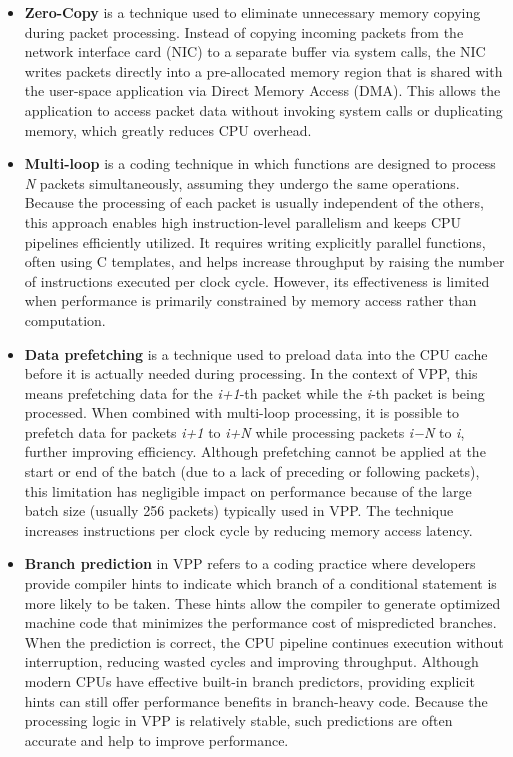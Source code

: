 \begin{itemize}
  \item \textbf{Zero-Copy} 
is a technique used to eliminate unnecessary memory copying during packet processing. 
Instead of copying incoming packets from the network interface card (NIC) to a separate buffer via system calls, 
the NIC writes packets directly into a pre-allocated memory region that is shared with the user-space application via Direct Memory Access (DMA). 
This allows the application to access packet data without invoking system calls or duplicating memory, which greatly reduces CPU overhead.~\cite{LINGUAGLOSSA}
 
  \item \textbf{Multi-loop} is a coding technique in which functions are designed to process \textit{N} packets simultaneously, assuming they undergo the same operations. 
Because the processing of each packet is usually independent of the others, this approach enables high instruction-level parallelism and keeps CPU pipelines efficiently utilized. 
It requires writing explicitly parallel functions, often using C templates, and helps increase throughput by raising the number of instructions executed per clock cycle. 
However, its effectiveness is limited when performance is primarily constrained by memory access rather than computation.~\cite{LINGUAGLOSSA}

  \item \textbf{Data prefetching} is a technique used to preload data into the CPU cache before it is actually needed during processing. 
In the context of VPP, this means prefetching data for the \textit{i+1}-th packet while the \textit{i}-th packet is being processed.
When combined with multi-loop processing, it is possible to prefetch data for packets \textit{i+1} to \textit{i+N} while processing packets \textit{i−N} to \textit{i}, further improving efficiency.
Although prefetching cannot be applied at the start or end of the batch (due to a lack of preceding or following packets), 
this limitation has negligible impact on performance because of the large batch size (usually 256 packets) typically used in VPP.
The technique increases instructions per clock cycle by reducing memory access latency.~\cite{LINGUAGLOSSA}

 \item \textbf{Branch prediction} in VPP refers to a coding practice where developers provide compiler hints to indicate which branch of a conditional statement is more likely to be taken.
These hints allow the compiler to generate optimized machine code that minimizes the performance cost of mispredicted branches.
When the prediction is correct, the CPU pipeline continues execution without interruption, reducing wasted cycles and improving throughput.
Although modern CPUs have effective built-in branch predictors, providing explicit hints can still offer performance benefits in branch-heavy code.
Because the processing logic in VPP is relatively stable, such predictions are often accurate and help to improve performance.~\cite{LINGUAGLOSSA}
 

\end{itemize}
